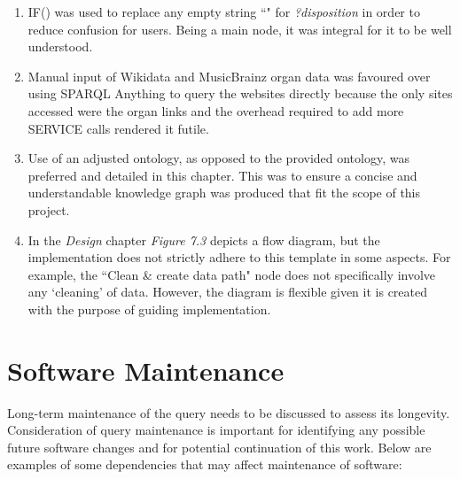 \begin{enumerate}
    \item IF() was used to replace any empty string ``" for \textit{?disposition} in order to reduce confusion for users. Being a main node, it was integral for it to be well understood. 
    \item Manual input of Wikidata and MusicBrainz organ data was favoured over using SPARQL Anything to query the websites directly because the only sites accessed were the organ links and the overhead required to add more SERVICE calls rendered it futile. 
    \item Use of an adjusted ontology, as opposed to the provided ontology, was preferred and detailed in this chapter. This was to ensure a concise and understandable knowledge graph was produced that fit the scope of this project. 
    \item In the \textit{Design} chapter \textit{Figure 7.3} depicts a flow diagram, but the implementation does not strictly adhere to this template in some aspects. For example, the ``Clean \& create data path" node does not specifically involve any `cleaning' of data. However, the diagram is flexible given it is created with the purpose of guiding implementation. 
\end{enumerate}

\section{Software Maintenance}
\hspace{0.5cm} Long-term maintenance of the query needs to be discussed to assess its longevity. Consideration of query maintenance is important for identifying any possible future software changes and for potential continuation of this work. Below are examples of some dependencies that may affect maintenance of software:  

